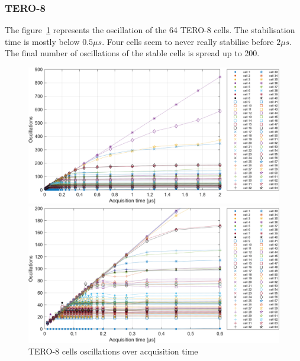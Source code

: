 \subsubsection*{TERO-8}

The figure~\ref{fig:tero_8_oscillation_vs_time} represents the oscillation of the 64 TERO-8 cells. The stabilisation time is mostly below $0.5 \mu s$. Four cells seem to never really stabilise before $2\mu s$. The final number of oscillations of the stable cells is spread up to 200.\\

\begin{figure}[H]
   \begin{minipage}[b]{\linewidth} 
        \centering
        \includegraphics[width=\linewidth]{images/tero_8_oscillations_vs_time.png}
   \end{minipage}
   \begin{minipage}[b]{\linewidth}   
        \centering
        \includegraphics[width=\linewidth]{images/tero_8_oscillations_vs_time_zoomed.png}
   \end{minipage}
   \caption{TERO-8 cells oscillations over acquisition time\label{fig:tero_8_oscillation_vs_time}}
\end{figure}


